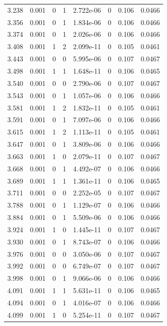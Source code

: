 \documentclass[preview]{standalone}
\begin{document}
{{{\begin{tabular}{L{1.2cm}C{1.2cm} C{0.3cm}C{0.5cm} C{1.4cm}C{1.4cm} C{1.4cm}C{1.4cm}}
  3.238  &  0.001  & 0     &  1 &  2.722e-06  & 0  & 0.106 &  0.0466   \\ 
  3.356  &  0.001  & 0     &  1 &  1.834e-06  & 0  & 0.106 &  0.0466   \\ 
  3.374  &  0.001  & 0     &  1 &  2.026e-06  & 0  & 0.106 &  0.0466   \\ 
  3.408  &  0.001  & 1     &  2 &  2.099e-11  & 0  & 0.105 &  0.0461   \\ 
  3.443  &  0.001  & 0     &  0 &  5.995e-06  & 0  & 0.107 &  0.0467   \\ 
  3.498  &  0.001  & 1     &  1 &  1.648e-11  & 0  & 0.106 &  0.0465   \\ 
  3.540  &  0.001  & 0     &  0 &  2.790e-06  & 0  & 0.107 &  0.0467   \\ 
  3.543  &  0.001  & 0     &  1 &  1.057e-06  & 0  & 0.106 &  0.0466   \\ 
  3.581  &  0.001  & 1     &  2 &  1.832e-11  & 0  & 0.105 &  0.0461   \\ 
  3.591  &  0.001  & 0     &  1 &  7.097e-06  & 0  & 0.106 &  0.0466   \\ 
  3.615  &  0.001  & 1     &  2 &  1.113e-11  & 0  & 0.105 &  0.0461   \\ 
  3.647  &  0.001  & 0     &  1 &  3.809e-06  & 0  & 0.106 &  0.0466   \\ 
  3.663  &  0.001  & 1     &  0 &  2.079e-11  & 0  & 0.107 &  0.0467   \\ 
  3.668  &  0.001  & 0     &  1 &  4.492e-07  & 0  & 0.106 &  0.0466   \\ 
  3.689  &  0.001  & 1     &  1 &  1.361e-11  & 0  & 0.106 &  0.0465   \\ 
  3.711  &  0.001  & 0     &  0 &  2.252e-05  & 0  & 0.107 &  0.0467   \\ 
  3.788  &  0.001  & 0     &  1 &  1.129e-07  & 0  & 0.106 &  0.0466   \\ 
  3.884  &  0.001  & 0     &  1 &  5.509e-06  & 0  & 0.106 &  0.0466   \\ 
  3.924  &  0.001  & 1     &  0 &  1.445e-11  & 0  & 0.107 &  0.0467   \\ 
  3.930  &  0.001  & 0     &  1 &  8.743e-07  & 0  & 0.106 &  0.0466   \\ 
  3.976  &  0.001  & 0     &  0 &  3.050e-06  & 0  & 0.107 &  0.0467   \\ 
  3.992  &  0.001  & 0     &  0 &  6.749e-07  & 0  & 0.107 &  0.0467   \\ 
  3.998  &  0.001  & 0     &  1 &  9.066e-06  & 0  & 0.106 &  0.0466   \\ 
  4.091  &  0.001  & 1     &  1 &  5.631e-11  & 0  & 0.106 &  0.0465   \\ 
  4.094  &  0.001  & 0     &  1 &  4.016e-07  & 0  & 0.106 &  0.0466   \\ 
  4.099  &  0.001  & 1     &  0 &  5.254e-11  & 0  & 0.107 &  0.0467   \\ 
\hline 
\end{tabular} 

}}}
\end{document}
